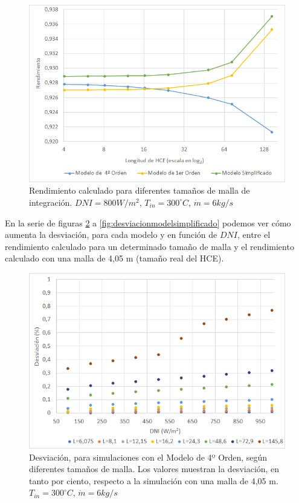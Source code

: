 \begin{figure}[H]
\includegraphics[width=0.9\linewidth]{images/malla_variable_DNI_800.png}
\caption[Rendimiento calculado para diferentes tamaños de malla de integración]{Rendimiento calculado para diferentes tamaños de malla de integración. $DNI=800 W/m^2$, $T_{in}=300 ^\circ C$, $\dot m = 6 kg/s$} 
\label{fig:malla_variable_DNI_800}
\end{figure}

En la serie de figuras \ref{fig:desviacionmodel4} a \ref{fig:desviacionmodelsimplificado} podemos ver cómo aumenta la desviación, para cada modelo y en función de $DNI$, entre el rendimiento calculado para un determinado tamaño de malla y el rendimiento calculado con una malla de 4,05 m (tamaño real del HCE).

\begin{figure}[H]
\includegraphics[width=0.9\linewidth]{images/desviacionmodel4malla.png}
\caption[Desviación, para simulaciones con el Modelo de 4º Orden, según diferentes tamaños de malla]{Desviación, para simulaciones con el Modelo de 4º Orden, según diferentes tamaños de malla. Los valores muestran la desviación, en tanto por ciento, respecto a la simulación con una malla de 4,05 m. $T_{in}=300 ^\circ C$, $\dot m = 6 kg/s$} 
\label{fig:desviacionmodel4}
\end{figure}

